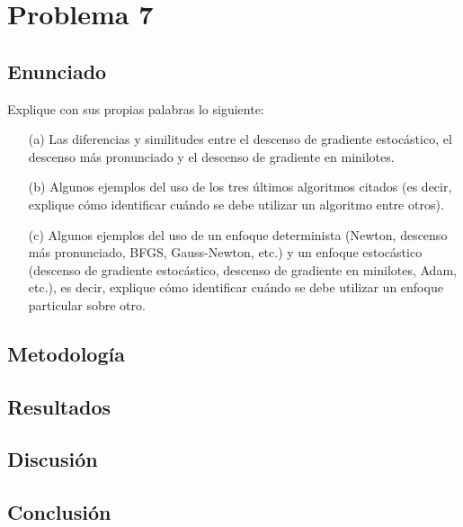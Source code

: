 \documentclass{article}
\begin{document}
\section{Problema 7}

\subsection{Enunciado}

Explique con sus propias palabras lo siguiente:

\begin{itemize}
    \item[(a)] Las diferencias y similitudes entre el descenso de gradiente estocástico, el descenso más pronunciado y el descenso de gradiente en minilotes.
    \item[(b)] Algunos ejemplos del uso de los tres últimos algoritmos citados (es decir, explique cómo identificar cuándo se debe utilizar un algoritmo entre otros).
    \item[(c)] Algunos ejemplos del uso de un enfoque determinista (Newton, descenso más pronunciado, BFGS, Gauss-Newton, etc.) y un enfoque estocástico (descenso de gradiente estocástico, descenso de gradiente en minilotes, Adam, etc.), es decir, explique cómo identificar cuándo se debe utilizar un enfoque particular sobre otro.

\end{itemize}

\subsection{Metodología}

\subsection{Resultados}
\setcounter{equation}{0}

\subsection{Discusión}

\subsection{Conclusión}
\end{document}

